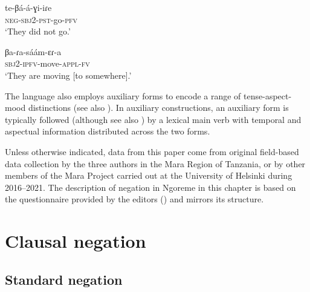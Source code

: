 \documentclass[output=paper,colorlinks,citecolor=brown,draftmode]{langscibook}
\begin{document}
\ea\label{ex:ngo:1} 
    \gll te-βá-á-ɣi-iɾe \\ 
        \textsc{neg-sbj2{}-pst}{}-go-\textsc{pfv}\\
    \glt \textsc{‘}They did not go.’ 
\z 
 
\ea\label{ex:ngo:2} 
    \gll βa-ɾa-sáám-ɛɾ{}-a \\ 
        \textsc{sbj}2-\textsc{ipfv}{}-move-\textsc{appl-fv} \textsc\\
    \glt \textsc{‘}They are moving [to somewhere].’
\z

The language also employs auxiliary forms to encode a range of tense-aspect-mood distinctions (see also ). In auxiliary constructions, an auxiliary form is typically followed (although see also ) by a lexical main verb with temporal and aspectual information distributed across the two forms.

Unless otherwise indicated, data from this paper come from original field-based data collection by the three authors in the Mara Region of Tanzania, or by other members of the Mara Project carried out at the University of Helsinki during 2016--2021. The description of negation in Ngoreme in this chapter is based on the questionnaire provided by the editors ()
and mirrors its structure.


\section{Clausal negation}\label{sec:ngo:2}
\subsection{Standard negation}\label{sec:ngo:2.1}
\end{document}
